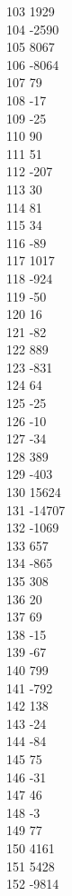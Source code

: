 { 103	1929 \\
 104	-2590 \\
 105	8067 \\
 106	-8064 \\
 107	79 \\
 108	-17 \\
 109	-25 \\
 110	90 \\
 111	51 \\
 112	-207 \\
 113	30 \\
 114	81 \\
 115	34 \\
 116	-89 \\
 117	1017 \\
 118	-924 \\
 119	-50 \\
 120	16 \\
 121	-82 \\
 122	889 \\
 123	-831 \\
 124	64 \\
 125	-25 \\
 126	-10 \\
 127	-34 \\
 128	389 \\
 129	-403 \\
 130	15624 \\
 131	-14707 \\
 132	-1069 \\
 133	657 \\
 134	-865 \\
 135	308 \\
 136	20 \\
 137	69 \\
 138	-15 \\
 139	-67 \\
 140	799 \\
 141	-792 \\
 142	138 \\
 143	-24 \\
 144	-84 \\
 145	75 \\
 146	-31 \\
 147	46 \\
 148	-3 \\
 149	77 \\
 150	4161 \\
 151	5428 \\
 152	-9814 \\
}
